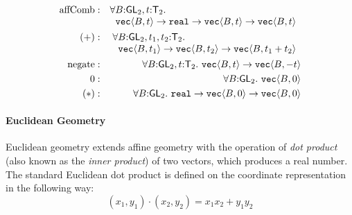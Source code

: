 \begin{eqnarray*}
  \mathrm{affComb} & : &
  \begin{array}[t]{@{}l}
    \forall B \mathord: \SynGL_2, t \mathord: \SynTransl_2.\\
    \hspace{0.2cm} \tyPrim{vec}{B,t} \to \tyPrimNm{real} \to \tyPrim{vec}{B,t} \to \tyPrim{vec}{B,t}
  \end{array}
  \\
  (+) & : &
  \begin{array}[t]{@{}l}
    \forall B \mathord: \SynGL_2, t_1,t_2 \mathord: \SynTransl_2. \\
    \hspace{0.2cm}\tyPrim{vec}{B,t_1} \to \tyPrim{vec}{B,t_2} \to \tyPrim{vec}{B,t_1 + t_2}
  \end{array}
  \\
  \mathrm{negate} & : & \forall B \mathord: \SynGL_2, t \mathord: \SynTransl_2.\ \tyPrim{vec}{B,t} \to \tyPrim{vec}{B,-t} \\
  0 & : & \forall B \mathord: \SynGL_2.\ \tyPrim{vec}{B,0} \\
  (*) & : & \forall B \mathord: \SynGL_2.\ \tyPrimNm{real} \to \tyPrim{vec}{B,0} \to \tyPrim{vec}{B,0}
\end{eqnarray*}


\paragraph{Euclidean Geometry} Euclidean geometry extends affine
geometry with the operation of \emph{dot product} (also known as the
\emph{inner product}) of two vectors, which produces a real
number. The standard Euclidean dot product is defined on the
coordinate representation in the following way:
\begin{displaymath}
  (x_1,y_1) \cdot (x_2,y_2) = x_1x_2 + y_1y_2
\end{displaymath}

